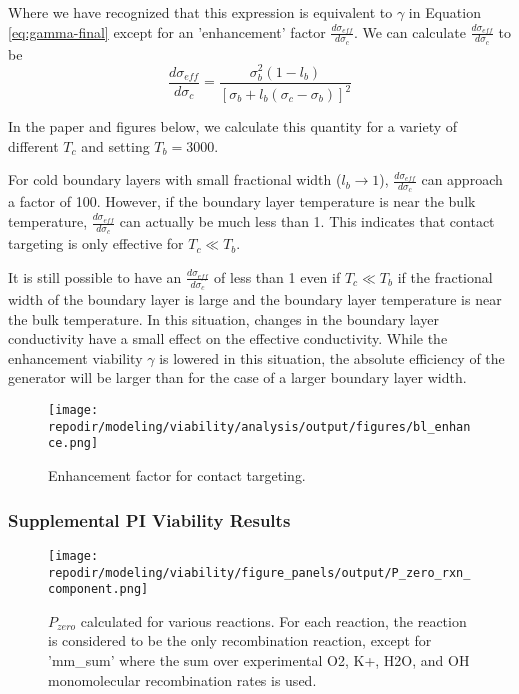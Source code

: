 Where we have recognized that this expression is equivalent to $\gamma$  in Equation \ref{eq:gamma-final} except for an 'enhancement' factor $\frac{d\sigma_{eff}}{d\sigma_{c}}$. We can calculate $\frac{d\sigma_{eff}}{d\sigma_{c}}$ to be
\begin{equation}
\frac{d\sigma_{eff}}{d\sigma_{c}}=\frac{\sigma_{b}^2 (1-l_{b})}{[\sigma_{b}+l_{b} (\sigma_{c}-\sigma_{b})]^2} 
\end{equation}


In the paper and figures below, we calculate this quantity for a variety of different $T_{c}$ and setting $T_{b} = 3000$.

For cold boundary layers with small fractional width ($l_{b}\rightarrow1$), $\frac{d\sigma_{eff}}{d\sigma_{c}}$ can approach a factor of 100. However, if the boundary layer temperature is near the bulk temperature, $\frac{d\sigma_{eff}}{d\sigma_{c}}$ can actually be much less than 1. This indicates that contact targeting is only effective for $T_{c} \ll T_{b}$. 

It is still possible to have an $\frac{d\sigma_{eff}}{d\sigma_{c}}$ of less than 1 even if $T_{c} \ll T_{b}$ if the fractional width of the boundary layer is large and the  boundary layer temperature is near the bulk temperature. In this situation, changes in the boundary layer conductivity have a small effect on the effective conductivity. While the enhancement viability $\gamma$ is lowered in this situation, the absolute efficiency of the generator will be larger than for the case of a larger boundary layer width.



\begin{figure}[h]
    \centering
    \texttt{[image: \\repodir/modeling/viability/analysis/output/figures/bl\_enhance.png]} 
    \caption{Enhancement factor for contact targeting.}
    \label{fig:SI_bl_enhance}
\end{figure}

\clearpage

\subsubsection{Supplemental PI Viability Results}

\begin{figure}[h]
    \centering
    \texttt{[image: \\repodir/modeling/viability/figure\_panels/output/P\_zero\_rxn\_component.png]} 
    \caption{$P_{zero}$ calculated for various reactions. For each reaction, the reaction is considered to be the only recombination reaction, except for 'mm\_sum' where the sum over experimental O2, K+, H2O, and OH monomolecular recombination rates is used.}
    \label{fig:SI_P_zero_rxn_component}
\end{figure}



